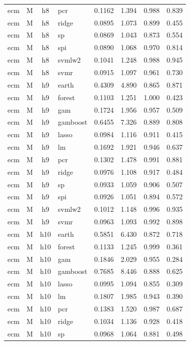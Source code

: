 \begin{ThreePartTable}
\begin{longtable}[t]{llclcccc}
ecm & M & h8 & pcr & 0.1162 & 1.394 & 0.988 & 0.839\\
ecm & M & h8 & ridge & 0.0895 & 1.073 & 0.899 & 0.455\\
ecm & M & h8 & sp & 0.0869 & 1.043 & 0.873 & 0.554\\
ecm & M & h8 & spi & 0.0890 & 1.068 & 0.970 & 0.814\\
ecm & M & h8 & svmlw2 & 0.1041 & 1.248 & 0.988 & 0.945\\
ecm & M & h8 & svmr & 0.0915 & 1.097 & 0.961 & 0.730\\
\addlinespace
ecm & M & h9 & earth & 0.4309 & 4.890 & 0.865 & 0.871\\
ecm & M & h9 & forest & 0.1103 & 1.251 & 1.000 & 0.423\\
ecm & M & h9 & gam & 0.1724 & 1.956 & 0.957 & 0.509\\
ecm & M & h9 & gamboost & 0.6455 & 7.326 & 0.889 & 0.808\\
ecm & M & h9 & lasso & 0.0984 & 1.116 & 0.911 & 0.415\\
ecm & M & h9 & lm & 0.1692 & 1.921 & 0.946 & 0.637\\
ecm & M & h9 & pcr & 0.1302 & 1.478 & 0.991 & 0.881\\
ecm & M & h9 & ridge & 0.0976 & 1.108 & 0.917 & 0.484\\
ecm & M & h9 & sp & 0.0933 & 1.059 & 0.906 & 0.507\\
ecm & M & h9 & spi & 0.0926 & 1.051 & 0.894 & 0.572\\
ecm & M & h9 & svmlw2 & 0.1012 & 1.148 & 0.996 & 0.935\\
ecm & M & h9 & svmr & 0.0963 & 1.093 & 0.992 & 0.898\\
\addlinespace
ecm & M & h10 & earth & 0.5851 & 6.430 & 0.872 & 0.718\\
ecm & M & h10 & forest & 0.1133 & 1.245 & 0.999 & 0.361\\
ecm & M & h10 & gam & 0.1846 & 2.029 & 0.955 & 0.284\\
ecm & M & h10 & gamboost & 0.7685 & 8.446 & 0.888 & 0.625\\
ecm & M & h10 & lasso & 0.0995 & 1.094 & 0.855 & 0.309\\
ecm & M & h10 & lm & 0.1807 & 1.985 & 0.943 & 0.390\\
ecm & M & h10 & pcr & 0.1383 & 1.520 & 0.987 & 0.687\\
ecm & M & h10 & ridge & 0.1034 & 1.136 & 0.928 & 0.418\\
ecm & M & h10 & sp & 0.0968 & 1.064 & 0.881 & 0.498\\

\end{longtable}
\end{ThreePartTable}
